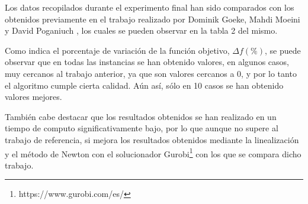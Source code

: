 Los datos recopilados durante el experimento final han sido comparados con los obtenidos previamente en el trabajo realizado por Dominik Goeke, Mahdi Moeini y David Poganiuch \cite{mrcp-GOEKE2017283}, los cuales se pueden observar en la tabla 2 del mismo. 

\begin{footnotesize}
\end{footnotesize}

Como indica el porcentaje de variación de la función objetivo, $\Delta f (\%)$, se puede observar que en todas las instancias se han obtenido valores, en algunos casos, muy cercanos al trabajo anterior, ya que son valores cercanos a 0, y por lo tanto el algoritmo cumple cierta calidad. Aún así, sólo en 10 casos se han obtenido valores mejores.

También cabe destacar que los resultados obtenidos se han realizado en un tiempo de computo significativamente bajo, por lo que aunque no supere al trabajo de referencia, si mejora los resultados obtenidos mediante la linealización y el método de Newton con el solucionador Gurobi\footnote{https://www.gurobi.com/es/} con los que se compara dicho trabajo.










